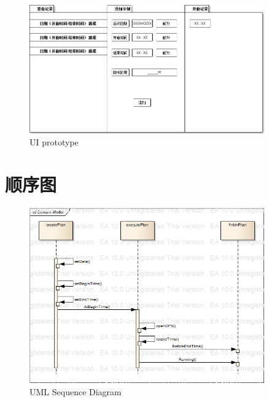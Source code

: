 \documentclass [a4paper,11pt]{article}
\begin{document}
\begin{figure}[ht!]
			\centering
			\includegraphics[width=0.9\textwidth]{81}
			\caption{UI prototype}
			\label{mylabel1}
		\end{figure}
		
\section*{顺序图}

\begin{figure}[ht!]
			\centering
			\includegraphics[width=0.9\textwidth]{82}
			\caption{UML Sequence Diagram}
			\label{mylabel1}
		\end{figure}
  
\end{document}
